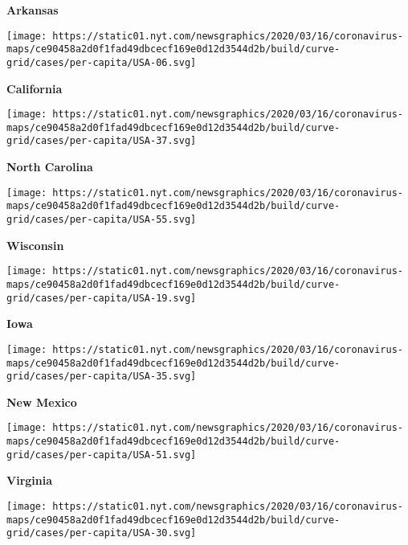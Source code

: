 \textbf{Arkansas}

\href{https://www.nytimes.com/interactive/2020/us/california-coronavirus-cases.html}{}

\texttt{[image: https://static01.nyt.com/newsgraphics/2020/03/16/coronavirus-maps/ce90458a2d0f1fad49dbcecf169e0d12d3544d2b/build/curve-grid/cases/per-capita/USA-06.svg]}

\textbf{California}

\href{https://www.nytimes.com/interactive/2020/us/north-carolina-coronavirus-cases.html}{}

\texttt{[image: https://static01.nyt.com/newsgraphics/2020/03/16/coronavirus-maps/ce90458a2d0f1fad49dbcecf169e0d12d3544d2b/build/curve-grid/cases/per-capita/USA-37.svg]}

\textbf{North Carolina}

\href{https://www.nytimes.com/interactive/2020/us/wisconsin-coronavirus-cases.html}{}

\texttt{[image: https://static01.nyt.com/newsgraphics/2020/03/16/coronavirus-maps/ce90458a2d0f1fad49dbcecf169e0d12d3544d2b/build/curve-grid/cases/per-capita/USA-55.svg]}

\textbf{Wisconsin}

\href{https://www.nytimes.com/interactive/2020/us/iowa-coronavirus-cases.html}{}

\texttt{[image: https://static01.nyt.com/newsgraphics/2020/03/16/coronavirus-maps/ce90458a2d0f1fad49dbcecf169e0d12d3544d2b/build/curve-grid/cases/per-capita/USA-19.svg]}

\textbf{Iowa}

\href{https://www.nytimes.com/interactive/2020/us/new-mexico-coronavirus-cases.html}{}

\texttt{[image: https://static01.nyt.com/newsgraphics/2020/03/16/coronavirus-maps/ce90458a2d0f1fad49dbcecf169e0d12d3544d2b/build/curve-grid/cases/per-capita/USA-35.svg]}

\textbf{New Mexico}

\href{https://www.nytimes.com/interactive/2020/us/virginia-coronavirus-cases.html}{}

\texttt{[image: https://static01.nyt.com/newsgraphics/2020/03/16/coronavirus-maps/ce90458a2d0f1fad49dbcecf169e0d12d3544d2b/build/curve-grid/cases/per-capita/USA-51.svg]}

\textbf{Virginia}

\href{https://www.nytimes.com/interactive/2020/us/montana-coronavirus-cases.html}{}

\texttt{[image: https://static01.nyt.com/newsgraphics/2020/03/16/coronavirus-maps/ce90458a2d0f1fad49dbcecf169e0d12d3544d2b/build/curve-grid/cases/per-capita/USA-30.svg]}


